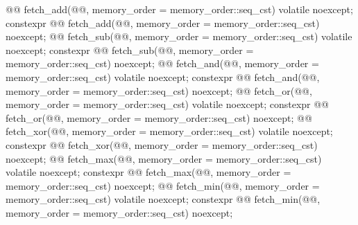 \begin{codeblock}
{{    @@ fetch_add(@@,
                            memory_order = memory_order::seq_cst) volatile noexcept;
    constexpr @@ fetch_add(@@,
                            memory_order = memory_order::seq_cst) noexcept;
    @@ fetch_sub(@@,
                            memory_order = memory_order::seq_cst) volatile noexcept;
    constexpr @@ fetch_sub(@@,
                            memory_order = memory_order::seq_cst) noexcept;
    @@ fetch_and(@@,
                            memory_order = memory_order::seq_cst) volatile noexcept;
    constexpr @@ fetch_and(@@,
                            memory_order = memory_order::seq_cst) noexcept;
    @@ fetch_or(@@,
                            memory_order = memory_order::seq_cst) volatile noexcept;
    constexpr @@ fetch_or(@@,
                            memory_order = memory_order::seq_cst) noexcept;
    @@ fetch_xor(@@,
                            memory_order = memory_order::seq_cst) volatile noexcept;
    constexpr @@ fetch_xor(@@,
                            memory_order = memory_order::seq_cst) noexcept;
    @@ fetch_max(@@,
                            memory_order = memory_order::seq_cst) volatile noexcept;
    constexpr @@ fetch_max(@@,
                            memory_order = memory_order::seq_cst) noexcept;
    @@ fetch_min(@@,
                            memory_order = memory_order::seq_cst) volatile noexcept;
    constexpr @@ fetch_min(@@,
                            memory_order = memory_order::seq_cst) noexcept;

}}
\end{codeblock}
